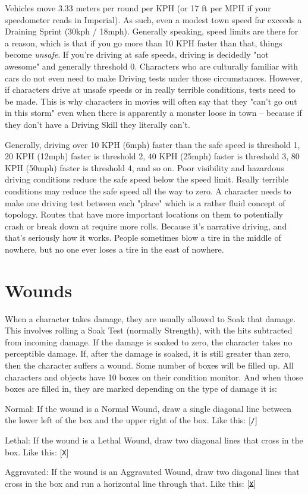 Vehicles move 3.33 meters per round per KPH (or 17 ft per MPH if your speedometer reads in Imperial). As such, even a modest town speed far exceeds a Draining Sprint (30kph / 18mph). Generally speaking, speed limits are there for a reason, which is that if you go more than 10 KPH faster than that, things become \textit{unsafe}. If you're driving at safe speeds, driving is decidedly "not awesome" and generally threshold 0. Characters who are culturally familiar with cars do not even need to make Driving tests under those circumstances. However, if characters drive at unsafe speeds or in really terrible conditions, tests need to be made. This is why characters in movies will often say that they "can't go out in this storm" even when there is apparently a monster loose in town -- because if they don't have a Driving Skill they literally can't.

Generally, driving over 10 KPH (6mph) faster than the safe speed is threshold 1, 20 KPH (12mph) faster is threshold 2, 40 KPH (25mph) faster is threshold 3, 80 KPH (50mph) faster is threshold 4, and so on. Poor visibility and hazardous driving conditions reduce the safe speed below the speed limit. Really terrible conditions may reduce the safe speed all the way to zero. A character needs to make one driving test between each "place" which is a rather fluid concept of topology. Routes that have more important locations on them to potentially crash or break down at require more rolls. Because it's narrative driving, and that's seriously how it works. People sometimes blow a tire in the middle of nowhere, but no one ever loses a tire in the east of nowhere.

\section{Wounds} 

When a character takes damage, they are usually allowed to Soak that damage. This involves rolling a Soak Test (normally Strength), with the hits subtracted from incoming damage. If the damage is soaked to zero, the character takes no perceptible damage. If, after the damage is soaked, it is still greater than zero, then the character suffers a wound. Some number of boxes will be filled up. All characters and objects have 10 boxes on their condition monitor. And when those boxes are filled in, they are marked depending on the type of damage it is:
\begin{description*}
\item[Normal:] If the wound is a Normal Wound, draw a single diagonal line between the lower left of the box and the upper right of the box. Like this: [\texttt{/}]
\item[Lethal:] If the wound is a Lethal Wound, draw two diagonal lines that cross in the box. Like this: [\texttt{X}]
\item[Aggravated:] If the wound is an Aggravated Wound, draw two diagonal lines that cross in the box and run a horizontal line through that. Like this: [\sout{\texttt{X}}]
\end{description*}

